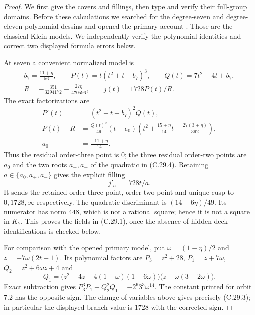 \begin{proof}
We first give the covers and fillings, then type and
verify their full-group domains. Before these calculations
we searched for the degree-seven and degree-eleven
polynomial dessins and opened the primary account
\cite[orbits 7.2 and 11.1, printed pp.~5--6 and
9--10]{PBC_AV2023}. Those are the classical Klein models.
We independently verify the polynomial identities and
correct two displayed formula errors below.

At seven a convenient normalized model is
\[
 \begin{gathered}
 b_7=\frac{11+\eta}{56},\qquad
 P(t)=t(t^2+t+b_7)^3,\qquad Q(t)=7t^2+4t+b_7,\\
 R=-\frac{351}{3294172}-\frac{27\eta}{470596},
 \qquad j(t)=1728P(t)/R.
 \end{gathered}
 \tag{C.29.3}
\]
The exact factorizations are
\[
 \begin{split}
 P'(t)&=(t^2+t+b_7)^2Q(t),\\
 P(t)-R&=\frac{Q(t)^2}{49}(t-a_0)
       \left(t^2+\frac{15+\eta}{14}t+
                         \frac{27(3+\eta)}{392}\right),\\
 a_0&=\frac{-11+\eta}{14}.
 \end{split}
 \tag{C.29.4}
\]
Thus the residual order-three point is $0$; the three
residual order-two points are $a_0$ and the two roots
$a_+,a_-$ of the quadratic in (C.29.4). Retaining
$a\in\{a_0,a_+,a_-\}$ gives the explicit filling
\[
                            j'_a=1728t/a.
 \tag{C.29.5}
\]
It sends the retained order-three point, order-two point
and unique cusp to $0,1728,\infty$ respectively.
The quadratic discriminant is $(14-6\eta)/49$.
Its numerator has norm $448$, which is not a rational
square; hence it is not a square in $K_7$.
This proves the fields in (C.29.1), once the absence
of hidden deck identifications is checked below.

For comparison with the opened primary model, put
$\omega=(1-\eta)/2$ and $z=-7\omega(2t+1)$.
Its polynomial factors are
$P_3=z^2+28$, $P_1=z+7\omega$,
$Q_2=z^2+6\omega z+4$ and
\[
 Q_1=\bigl(z^2-4z-4(1-\omega)(1-6\omega)\bigr)
                         \bigl(z-\omega(3+2\omega)\bigr).
\]
Exact subtraction gives
$P_3^3P_1-Q_2^2Q_1=-2^6 3^3\omega^{14}$.
The constant printed for orbit 7.2 has the opposite
sign. The change of variables above gives precisely
(C.29.3); in particular the displayed branch value
is $1728$ with the corrected sign.


\end{proof}
